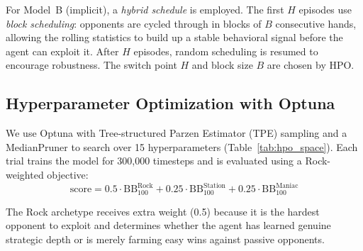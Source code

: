 \documentclass[conference]{IEEEtran}
\begin{document}
For Model~B (implicit), a \textit{hybrid schedule} is employed. The
first $H$ episodes use \textit{block scheduling}: opponents are
cycled through in blocks of $B$ consecutive hands, allowing the
rolling statistics to build up a stable behavioral signal before the
agent can exploit it. After $H$ episodes, random scheduling is
resumed to encourage robustness. The switch point $H$ and block size
$B$ are chosen by HPO.

\subsection{Hyperparameter Optimization with Optuna}

We use Optuna \cite{akiba2019optuna} with Tree-structured Parzen
Estimator (TPE) sampling and a MedianPruner to search over 15
hyperparameters (Table~\ref{tab:hpo_space}). Each trial trains the
model for 300,000 timesteps and is evaluated using a
Rock-weighted objective:
\begin{equation}
\text{score} = 0.5 \cdot \text{BB}_{100}^{\text{Rock}}
             + 0.25 \cdot \text{BB}_{100}^{\text{Station}}
             + 0.25 \cdot \text{BB}_{100}^{\text{Maniac}}
\label{eq:hpo_obj}
\end{equation}

The Rock archetype receives extra weight (0.5) because it is the
hardest opponent to exploit and determines whether the agent has
learned genuine strategic depth or is merely farming easy wins
against passive opponents.
\end{document}
